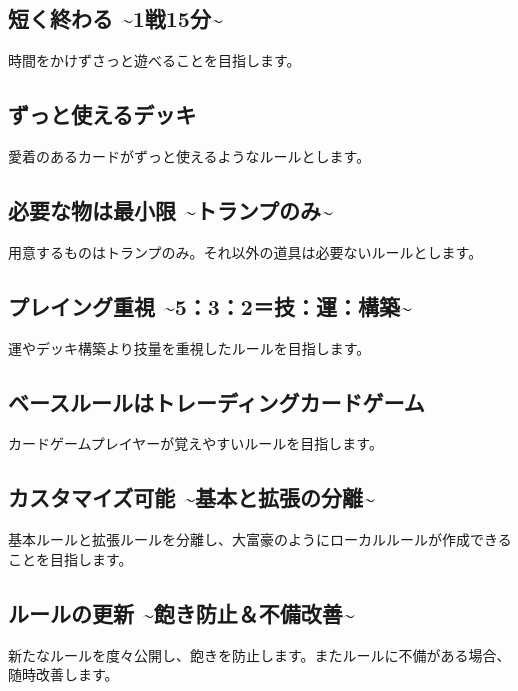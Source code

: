 \documentclass[letterpaper,10pt,dvipdfmx]{sphinxmanual}
\begin{document}
\subsection{短く終わる \textasciitilde{}1戦15分\textasciitilde{}}
\label{\detokenize{init/init:id6}}
\sphinxAtStartPar
時間をかけずさっと遊べることを目指します。


\subsection{ずっと使えるデッキ}
\label{\detokenize{init/init:id7}}
\sphinxAtStartPar
愛着のあるカードがずっと使えるようなルールとします。


\subsection{必要な物は最小限 \textasciitilde{}トランプのみ\textasciitilde{}}
\label{\detokenize{init/init:id8}}
\sphinxAtStartPar
用意するものはトランプのみ。それ以外の道具は必要ないルールとします。


\subsection{プレイング重視 \textasciitilde{}5：3：2＝技：運：構築\textasciitilde{}}
\label{\detokenize{init/init:id9}}
\sphinxAtStartPar
運やデッキ構築より技量を重視したルールを目指します。


\subsection{ベースルールはトレーディングカードゲーム}
\label{\detokenize{init/init:id10}}
\sphinxAtStartPar
カードゲームプレイヤーが覚えやすいルールを目指します。


\subsection{カスタマイズ可能 \textasciitilde{}基本と拡張の分離\textasciitilde{}}
\label{\detokenize{init/init:id11}}
\sphinxAtStartPar
基本ルールと拡張ルールを分離し、大富豪のようにローカルルールが作成できることを目指します。


\subsection{ルールの更新 \textasciitilde{}飽き防止＆不備改善\textasciitilde{}}
\label{\detokenize{init/init:id12}}
\sphinxAtStartPar
新たなルールを度々公開し、飽きを防止します。またルールに不備がある場合、随時改善します。
\end{document}
